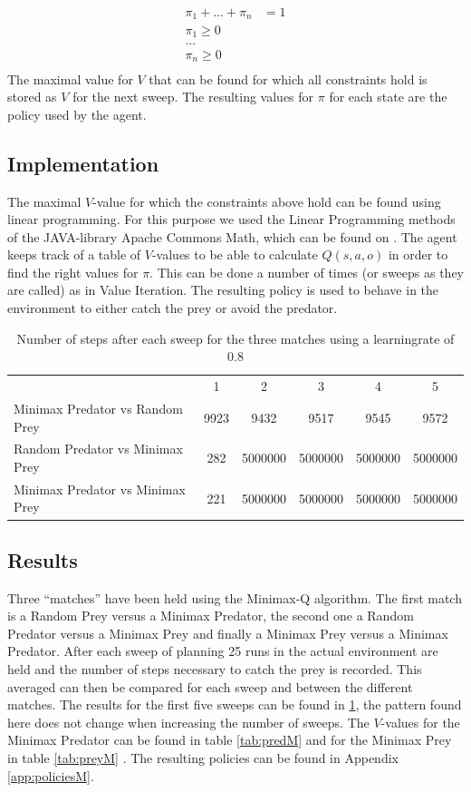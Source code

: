 \begin{align*}
\pi_1 + ... + \pi_n &= 1\\
\pi_1 \geq 0\\
...\\
\pi_n  \geq 0\\
\end{align*}
The maximal value for $V$ that can be found for which all constraints hold is stored as $V$ for the next sweep. The resulting values for $\pi$ for each state are the policy used by the agent.

\subsection{Implementation}
The maximal $V$-value for which the constraints above hold can be found using linear programming. For this purpose we used the Linear Programming methods of the JAVA-library Apache Commons Math, which can be found on \cite{commonsmath}. The agent keeps track of a table of $V$-values to be able to calculate $Q(s,a,o)$ in order to find the right values for $\pi$. This can be done a number of times (or sweeps as they are called) as in Value Iteration. The resulting policy is used to behave in the environment to either catch the prey or avoid the predator.

\begin{table}[htb]
\centering
\begin{tabular}{lccccc}
&1&2&3&4&5\\
Minimax Predator vs Random Prey & 9923 & 9432&9517&9545&9572\\
Random Predator vs Minimax Prey & 282& 5000000& 5000000& 5000000& 5000000\\
Minimax Predator vs Minimax Prey & 221& 5000000& 5000000& 5000000& 5000000\\
\end{tabular}
\caption{Number of steps after each sweep for the three matches using a learningrate of 0.8}
\label{tab:minimaxTable}
\end{table}

\FloatBarrier

\subsection{Results}
Three ``matches'' have been held using the Minimax-Q algorithm. The first match is a Random Prey versus a Minimax Predator, the second one a Random Predator versus a Minimax Prey and finally a Minimax Prey versus a Minimax Predator. After each sweep of planning 25 runs in the actual environment are held and the number of steps necessary to catch the prey is recorded. This averaged can then be compared for each sweep and between the different matches. The results for the first five sweeps can be found in \ref{tab:minimaxTable}, the pattern found here does not change when increasing the number of sweeps. The $V$-values for the Minimax Predator can be found in table \ref{tab:predM} and for the Minimax Prey in table \ref{tab:preyM} .  The resulting policies can be found in Appendix \ref{app:policiesM}.

